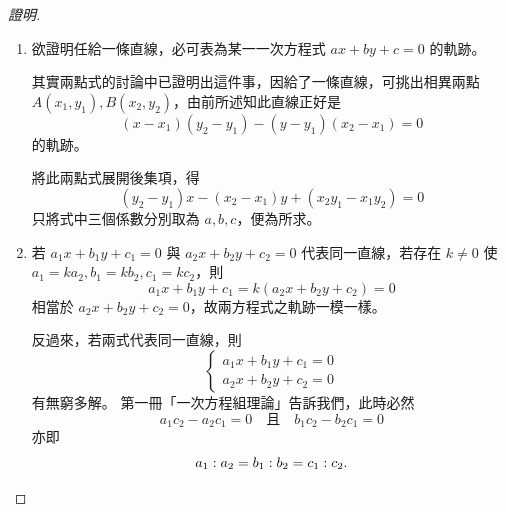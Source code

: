 \begin{proof}[證明]
\begin{enumerate}[label=(\Roman*), leftmargin=2em]
  反過來 $ax + by + c = 0$ 上的點，也一定要在 $L$ 上。道理是這樣：
  若 $P(x, y)$ 滿足 $ax + by + c = 0$，則由 \eqref{eq:b3s-4-13} 式可得
  \begin{align*}
  -a(x - x_1) &= b(y - y_1) \\
  -b(y_2 - y_1) &= a(x_2 - x_1)
  \end{align*}
  故當 $a \neq 0$ 時，上兩式相乘，移項得
  \[ (x - x_1)(y_2 - y_1) - (y - y_1)(x_2 - x_1) = 0 \]
  由兩點式中的討論知 $P(x, y)$ 就在 $L$ 上。
  
  如果 $a = 0$，則 $y = -\frac{c}{b}$，而由 \eqref{eq:b3s-4-13} 式 $y_1, y_2$ 亦皆等於 $-\frac{c}{b}$，$L$ 為 $y$ 座標等於 $-\frac{c}{b}$ 而平行於 $X$ 軸的直線，故 $P(x, -\frac{c}{b})$ 即在 $L$ 上，見圖 \ref{fig:4-23}。
  
  \begin{figure}[H]
  \centering
  \caption{$a=0$ 時平行於 $X$ 軸之直線}
  \label{fig:4-23}
  \end{figure}
  
  \item 欲證明任給一條直線，必可表為某一一次方程式 $ax + by + c = 0$ 的軌跡。
  
  其實兩點式的討論中已證明出這件事，因給了一條直線，可挑出相異兩點 $A(x_1, y_1), B(x_2, y_2)$，由前所述知此直線正好是
  \[ (x - x_1)(y_2 - y_1) - (y - y_1)(x_2 - x_1) = 0 \]
  的軌跡。
  
  將此兩點式展開後集項，得
  \[ (y_2 - y_1)x - (x_2 - x_1)y + (x_2 y_1 - x_1 y_2) = 0 \]
  只將式中三個係數分別取為 $a, b, c$，便為所求。
  
  \item 若 $a_1 x + b_1 y + c_1 = 0$ 與 $a_2 x + b_2 y + c_2 = 0$ 代表同一直線，若存在 $k \neq 0$ 使 $a_1 = k a_2, b_1 = k b_2, c_1 = k c_2$，則
  \[ a_1 x + b_1 y + c_1 = k(a_2 x + b_2 y + c_2) = 0 \]
  相當於 $a_2 x + b_2 y + c_2 = 0$，故兩方程式之軌跡一模一樣。
  
  反過來，若兩式代表同一直線，則
  \[ \begin{cases} a_1 x + b_1 y + c_1 = 0 \\ a_2 x + b_2 y + c_2 = 0 \end{cases} \]
  有無窮多解。
  第一冊「一次方程組理論」告訴我們，此時必然
  \[ a_1 c_2 - a_2 c_1 = 0 \quad\text{且}\quad b_1 c_2 - b_2 c_1 = 0 \]
  亦即
  \[ a_1 : a_2 = b_1 : b_2 = c_1 : c_2. \qedhere \]
\end{enumerate}
\end{proof}

